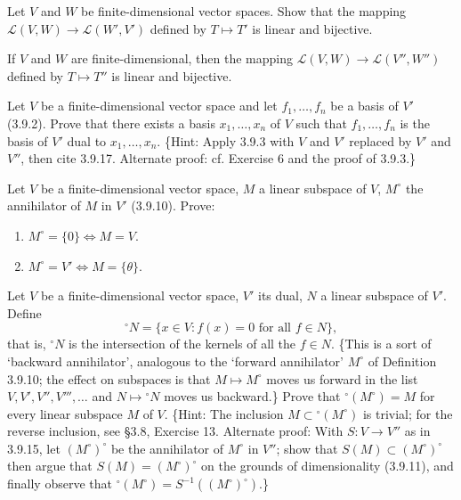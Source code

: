 \begin{tcolorbox}[title=Exercise 10, breakable]
    Let $V$ and $W$ be finite-dimensional vector spaces. Show that the mapping 
    $\mathcal{L}(V, W) \to \mathcal{L}(W', V')$ defined by $T \mapsto T'$ is linear and bijective.
\end{tcolorbox}

\begin{tcolorbox}[title=Exercise 11, breakable]
    If $V$ and $W$ are finite-dimensional, then the mapping 
    $\mathcal{L}(V, W) \to \mathcal{L}(V'', W'')$ defined by $T \mapsto T''$ is linear and bijective.
\end{tcolorbox}

\begin{tcolorbox}[title=Exercise 12, breakable]
    Let $V$ be a finite-dimensional vector space and let $f_1, \ldots, f_n$ be a basis 
    of $V'$ (3.9.2). Prove that there exists a basis $x_1, \ldots, x_n$ of $V$ such that 
    $f_1, \ldots, f_n$ is the basis of $V'$ dual to $x_1, \ldots, x_n$. \{Hint: Apply 3.9.3 with 
    $V$ and $V'$ replaced by $V'$ and $V''$, then cite 3.9.17. Alternate proof: cf. 
    Exercise 6 and the proof of 3.9.3.\}
\end{tcolorbox}

\begin{tcolorbox}[title=Exercise 13, breakable]
    Let $V$ be a finite-dimensional vector space, $M$ a linear subspace of $V$, 
    $M^\circ$ the annihilator of $M$ in $V'$ (3.9.10). Prove:
    \begin{enumerate}
        \item[(i)] $M^\circ = \{0\} \Leftrightarrow M = V$.
        \item[(ii)] $M^\circ = V' \Leftrightarrow M = \{\theta\}$.
    \end{enumerate}
\end{tcolorbox}

\begin{tcolorbox}[title=Exercise 14, breakable]
    Let $V$ be a finite-dimensional vector space, $V'$ its dual, $N$ a linear 
    subspace of $V'$. Define
    \[{}^\circ N = \{x \in V : f(x) = 0 \text{ for all } f \in N\},\]
    that is, ${}^\circ N$ is the intersection of the kernels of all the $f \in N$. \{This is a 
    sort of `backward annihilator', analogous to the `forward annihilator' $M^\circ$ 
    of Definition 3.9.10; the effect on subspaces is that $M \mapsto M^\circ$ moves us 
    forward in the list $V, V', V'', V''', \ldots$ and $N \mapsto {}^\circ N$ moves us backward.\}
    Prove that ${}^\circ(M^\circ) = M$ for every linear subspace $M$ of $V$.
    \{Hint: The inclusion $M \subset {}^\circ(M^\circ)$ is trivial; for the reverse inclusion, see 
    \S 3.8, Exercise 13. Alternate proof: With $S : V \to V''$ as in 3.9.15, let 
    $(M^\circ)^\circ$ be the annihilator of $M^\circ$ in $V''$; show that $S(M) \subset (M^\circ)^\circ$ then 
    argue that $S(M) = (M^\circ)^\circ$ on the grounds of dimensionality (3.9.11), and 
    finally observe that ${}^\circ(M^\circ) = S^{-1}((M^\circ)^\circ)$.\}
\end{tcolorbox}

